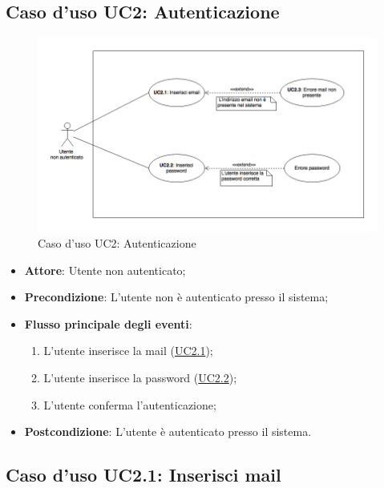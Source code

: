 \documentclass[12pt,a4paper]{article}
\begin{document}
\subsection{Caso d'uso UC2: Autenticazione}
\begin{figure}[H]
	\centering
	\includegraphics[width=\textwidth]{diagramUC2.png}
	\caption{Caso d'uso UC2: Autenticazione}\label{fig:UC2} 
\end{figure}
\begin{itemize}

\item \textbf{Attore}: Utente non autenticato; 
\item \textbf{Precondizione}: L'utente non è autenticato presso il sistema;

\item \textbf{Flusso principale degli eventi}:
\begin{enumerate}
	\item L'utente inserisce la mail (\hyperlink{UC2.1}{UC2.1});
	\item L'utente inserisce la password (\hyperlink{UC2.2}{UC2.2});
	\item L'utente conferma l'autenticazione;
	
\end{enumerate}
\item \textbf{Postcondizione}: L'utente è autenticato presso il sistema.
\end{itemize}
\hypertarget{UC2.1}{}
\subsection{Caso d'uso UC2.1: Inserisci mail}
\end{document}
